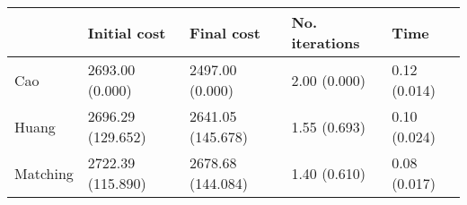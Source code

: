 \begin{tabular}{lllll}
\toprule
{} &       Initial cost &         Final cost & No. iterations &          Time \\
\midrule
Cao      &    2693.00 (0.000) &    2497.00 (0.000) &   2.00 (0.000) &  0.12 (0.014) \\
Huang    &  2696.29 (129.652) &  2641.05 (145.678) &   1.55 (0.693) &  0.10 (0.024) \\
Matching &  2722.39 (115.890) &  2678.68 (144.084) &   1.40 (0.610) &  0.08 (0.017) \\
\bottomrule
\end{tabular}
